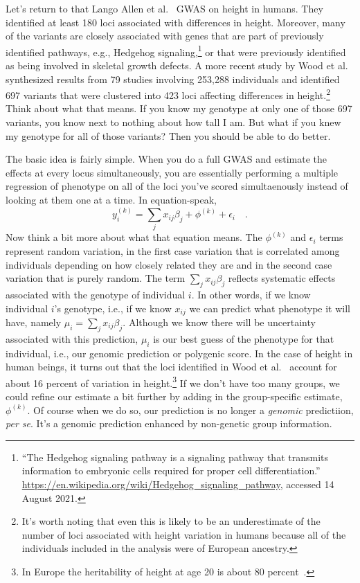 Let's return to that Lango Allen et al.~\cite{LangoAllen-etal-2010}
GWAS on height in humans. They identified at least 180 loci associated
with differences in height. Moreover, many of the variants are closely
associated with genes that are part of previously identified pathways,
e.g., Hedgehog signaling,\footnote{``The Hedgehog signaling pathway is
  a signaling pathway that transmits information to embryonic cells
  required for proper cell differentiation.''
  \url{https://en.wikipedia.org/wiki/Hedgehog_signaling_pathway},
  accessed 14 August 2021.} or
that were previously identified as being involved in skeletal growth
defects. A more recent study by Wood et al.~\cite{Wood-etal-2014}
synthesized results from 79 studies involving 253,288 individuals and
identified 697 variants that were clustered into 423 loci affecting
differences in height.\footnote{It's worth noting that even this is
  likely to be an underestimate of the number of loci associated with
  height variation in humans because all of the individuals included
  in the analysis were of European ancestry.} Think about what that
means. If you know my genotype at only one of those 697 variants, you
know next to nothing about how tall I am. But what if you knew my
genotype for all of those variants? Then you should be able to do
better.

The basic idea is fairly simple. When you do a full GWAS and estimate
the effects at every locus simultaneously, you are essentially
performing a multiple regression of phenotype on all of the loci
you've scored simultaenously instead of looking at them one at a
time. In equation-speak,
\[
y_i^{(k)} = \sum_j x_{ij}\beta_j + \phi^{(k)} + \epsilon_i \quad .
\]
Now think a bit more about what that equation means. The $\phi^{(k)}$
and $\epsilon_i$ terms represent random variation, in the first case
variation that is correlated among individuals depending on how
closely related they are and in the second case variation that is
purely random. The term $\sum_j x_{ij}\beta_j$ reflects systematic
effects associated with the genotype of individual $i$. In other
words, if we know individual $i$'s genotype, i.e., if we know $x_{ij}$
we can predict what phenotype it will have, namely
$\mu_i = \sum_j x_{ij}\beta_j$. Although we know there will be
uncertainty associated with this prediction, $\mu_i$ is our best guess
of the phenotype for that individual, i.e., our genomic prediction or
polygenic score. In the case of height in human beings, it turns out
that the loci identified in Wood et al.~\cite{Wood-etal-2014} account
for about 16 percent of variation in height.\footnote{In Europe the
  heritability of height at age 20 is about 80
  percent~\cite{Jelenkovic-etal-2016}.}
 If we don't have too many groups, we could
refine our estimate a bit further by adding in the group-specific
estimate, $\phi^{(k)}$. Of course when we do so, our prediction is no
longer a {\it genomic\/} predictiion, {\it per se}. It's a genomic
prediction enhanced by non-genetic group information.

